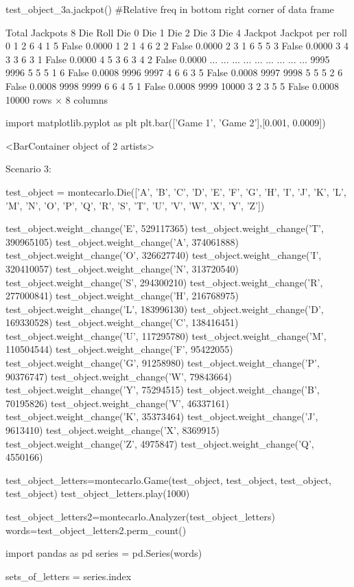 test_object_3a.jackpot()
#Relative freq in bottom right corner of data frame

Total Jackpots 8
Die	Roll	Die 0	Die 1	Die 2	Die 3	Die 4	Jackpot	Jackpot per roll
0	1	2	6	4	1	5	False	0.0000
1	2	1	4	6	2	2	False	0.0000
2	3	1	6	5	5	3	False	0.0000
3	4	3	3	6	3	1	False	0.0000
4	5	3	6	3	4	2	False	0.0000
...	...	...	...	...	...	...	...	...
9995	9996	5	5	5	1	6	False	0.0008
9996	9997	4	6	6	3	5	False	0.0008
9997	9998	5	5	5	2	6	False	0.0008
9998	9999	6	6	4	5	1	False	0.0008
9999	10000	3	2	3	5	5	False	0.0008
10000 rows × 8 columns

import matplotlib.pyplot as plt
plt.bar(['Game 1', 'Game 2'],[0.001, 0.0009])

<BarContainer object of 2 artists>

Scenario 3:

test_object = montecarlo.Die(['A', 'B', 'C', 'D', 'E', 'F', 'G', 'H', 'I', 'J', 'K', 'L', 'M', 'N', 'O', 'P', 'Q', 'R', 'S', 'T', 'U', 'V', 'W', 'X', 'Y', 'Z'])

test_object.weight_change('E', 529117365) 
test_object.weight_change('T', 390965105)
test_object.weight_change('A', 374061888)
test_object.weight_change('O', 326627740)
test_object.weight_change('I', 320410057)
test_object.weight_change('N', 313720540)
test_object.weight_change('S', 294300210)
test_object.weight_change('R', 277000841)
test_object.weight_change('H', 216768975)
test_object.weight_change('L', 183996130)
test_object.weight_change('D', 169330528)
test_object.weight_change('C', 138416451)
test_object.weight_change('U', 117295780)
test_object.weight_change('M', 110504544)
test_object.weight_change('F', 95422055)
test_object.weight_change('G', 91258980)
test_object.weight_change('P', 90376747)
test_object.weight_change('W', 79843664)
test_object.weight_change('Y', 75294515)
test_object.weight_change('B', 70195826)
test_object.weight_change('V', 46337161)
test_object.weight_change('K', 35373464)
test_object.weight_change('J', 9613410)
test_object.weight_change('X', 8369915)
test_object.weight_change('Z', 4975847)
test_object.weight_change('Q', 4550166)

test_object_letters=montecarlo.Game(test_object, test_object, test_object, test_object)
test_object_letters.play(1000)

test_object_letters2=montecarlo.Analyzer(test_object_letters)
words=test_object_letters2.perm_count()

import pandas as pd
series = pd.Series(words)

sets_of_letters = series.index

